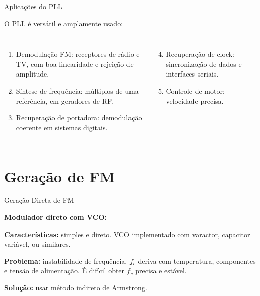 \begin{frame}{Aplicações do PLL}

\small
O PLL é versátil e amplamente usado:

\begin{columns}[T]
\begin{enumerate}
\item Demodulação FM: receptores de rádio e TV, com boa linearidade e rejeição de amplitude.
\item Síntese de frequência: múltiplos de uma referência, em geradores de RF.
\item Recuperação de portadora: demodulação coerente em sistemas digitais.
\end{enumerate}
\begin{enumerate}\setcounter{enumi}{3}
\item Recuperação de clock: sincronização de dados e interfaces seriais.
\item Controle de motor: velocidade precisa.
\end{enumerate}
\end{columns}

\end{frame}


\section{Geração de FM}

\begin{frame}{Geração Direta de FM}

\textbf{Modulador direto com VCO:}

\begin{center}
\end{center}

\textbf{Características:} simples e direto. VCO implementado com varactor, capacitor variável, ou similares.

\pause
\vspace{0.2cm}
\textbf{Problema:} instabilidade de frequência. $f_c$ deriva com temperatura, componentes e tensão de alimentação. É difícil obter $f_c$ precisa e estável.

\pause
\textbf{Solução:} usar método indireto de Armstrong.

\end{frame}

